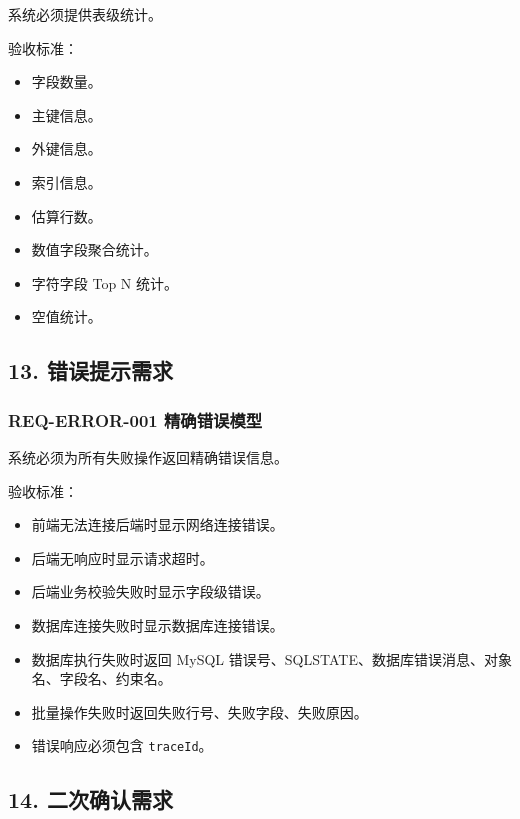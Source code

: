 \documentclass[
  a4paper,
  UTF8]{ctexart}
\providecommand{\tightlist}{%
  \setlength{\itemsep}{0pt}\setlength{\parskip}{0pt}}
\begin{document}
系统必须提供表级统计。

验收标准：

\begin{itemize}
\tightlist
\item
  字段数量。
\item
  主键信息。
\item
  外键信息。
\item
  索引信息。
\item
  估算行数。
\item
  数值字段聚合统计。
\item
  字符字段 Top N 统计。
\item
  空值统计。
\end{itemize}

\hypertarget{ux9519ux8befux63d0ux793aux9700ux6c42}{%
\subsection{13.
错误提示需求}\label{ux9519ux8befux63d0ux793aux9700ux6c42}}

\hypertarget{req-error-001-ux7cbeux786eux9519ux8befux6a21ux578b}{%
\subsubsection{REQ-ERROR-001
精确错误模型}\label{req-error-001-ux7cbeux786eux9519ux8befux6a21ux578b}}

系统必须为所有失败操作返回精确错误信息。

验收标准：

\begin{itemize}
\tightlist
\item
  前端无法连接后端时显示网络连接错误。
\item
  后端无响应时显示请求超时。
\item
  后端业务校验失败时显示字段级错误。
\item
  数据库连接失败时显示数据库连接错误。
\item
  数据库执行失败时返回 MySQL
  错误号、SQLSTATE、数据库错误消息、对象名、字段名、约束名。
\item
  批量操作失败时返回失败行号、失败字段、失败原因。
\item
  错误响应必须包含 \texttt{traceId}。
\end{itemize}

\hypertarget{ux4e8cux6b21ux786eux8ba4ux9700ux6c42}{%
\subsection{14.
二次确认需求}\label{ux4e8cux6b21ux786eux8ba4ux9700ux6c42}}
\end{document}
